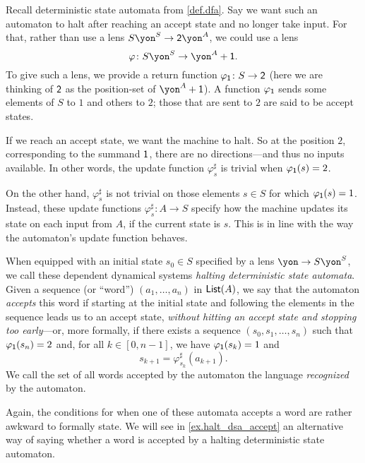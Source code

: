 \documentclass[Book-Poly]{subfiles}
\begin{document}
\begin{example}\label{ex.regular_lang_stop}
Recall deterministic state automata from \cref{def.dfa}.
Say we want such an automaton to halt after reaching an accept state and no longer take input.
For that, rather than use a lens $S\yon^S\to \2\yon^A$, we could use a lens
\[
\varphi\colon S\yon^S\to \yon^A+\1.
\]
To give such a lens, we provide a return function $\varphi_{\textsf{1}}\colon S\to\textsf{2}$ (here we are thinking of $\textsf{2}$ as the position-set of $\yon^A+\1$).
A function $\varphi_{\textsf{1}}$ sends some elements of $S$ to $1$ and others to $2$; those that are sent to $2$ are said to be accept states.

If we reach an accept state, we want the machine to halt.
So at the position $2$, corresponding to the summand $\textsf{1}$, there are no directions---and thus no inputs available.
In other words, the update function $\varphi^\sharp_s$ is trivial when $\varphi_{\textsf{1}}(s)=2$.

On the other hand, $\varphi^\sharp_s$ is not trivial on those elements $s\in S$ for which $\varphi_{\textsf{1}}(s)=1$.
Instead, these update functions $\varphi^\sharp_s\colon A\to S$ specify how the machine updates its state on each input from $A$, if the current state is $s$.
This is in line with the way the automaton's update function behaves.

When equipped with an initial state $s_0\in S$ specified by a lens $\yon\to S\yon^S$, we call these dependent dynamical systems \emph{halting deterministic state automata}.
Given a sequence (or ``word'') $(a_1,\ldots,a_n)$ in $\mathsf{List}(A)$, we say that the automaton \emph{accepts} this word if starting at the initial state and following the elements in the sequence leads us to an accept state, \emph{without hitting an accept state and stopping too early}---or, more formally, if there exists a sequence $(s_0,s_1,\ldots,s_n)$ such that $\varphi_{\textsf{1}}(s_n)=2$ and, for all $k\in[0,n-1]$, we have $\varphi_{\textsf{1}}(s_k)=1$ and
\[
    s_{k+1}=\varphi^\sharp_{s_k}(a_{k+1}).
\]
We call the set of all words accepted by the automaton the language \emph{recognized} by the automaton.
\end{example}

\begin{remark}
Again, the conditions for when one of these automata accepts a word are rather awkward to formally state.
We will see in \cref{ex.halt_dsa_accept} an alternative way of saying whether a word is accepted by a halting deterministic state automaton.
\end{remark}
\end{document}
